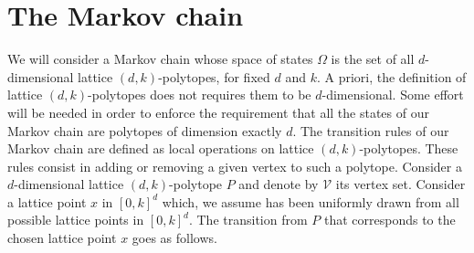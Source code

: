 \documentclass[a4paper]{article}
\newcommand{\p}{\mathcal{P}}
\begin{document}
\section{The Markov chain}\label{Sec.MC}


We will consider a Markov chain whose space of states $\Omega$ is the set of all $d$-dimensional lattice $(d,k)$-polytopes, for fixed $d$ and $k$. A priori, the definition of lattice $(d,k)$-polytopes does not requires them to be $d$-dimensional. Some effort will be needed in order to enforce the requirement that all the states of our Markov chain are polytopes of dimension exactly $d$. %
%
The transition rules of our Markov chain are defined as local operations on lattice $(d,k)$-polytopes. These rules consist in adding or removing a given vertex to such a polytope. Consider a $d$-dimensional lattice $(d,k)$-polytope $P$ and denote by $\mathcal{V}$ its vertex set. Consider a lattice point $x$ in $[0,k]^d$ which, we assume has been uniformly drawn from all possible lattice points in $[0,k]^d$. The transition from $P$ that corresponds to the chosen lattice point $x$ goes as follows.
\end{document}
